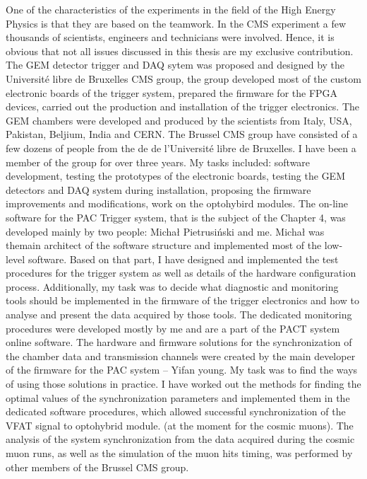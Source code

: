 
\def\baselinestretch{0.5}


One of the characteristics of the experiments in the field of the High Energy
Physics is that they are based on the teamwork. In the CMS experiment a few thousands of
scientists, engineers and technicians were involved. Hence, it is obvious that not all issues
discussed in this thesis are my exclusive contribution.
The GEM detector trigger and DAQ sytem was proposed and designed by the Université libre de Bruxelles CMS
group, the group developed most of the custom electronic boards of the trigger system,
prepared the firmware for the FPGA devices, carried out the production and installation of the
trigger electronics. The GEM chambers were developed and produced by the scientists from
Italy, USA, Pakistan, Beljium, India and CERN. The Brussel CMS group have consisted
of a few dozens of people from the de de l'Université libre de Bruxelles. I have been a member of the group for over three years. My tasks included: software development, testing the prototypes of the electronic boards, testing the GEM detectors and DAQ system during installation, proposing the firmware improvements and modifications, work on the optohybird modules.
The on-line software for the PAC Trigger system, that is the subject of the
Chapter 4, was developed mainly by two people: Michał Pietrusiński and me. Michał was themain architect of the software structure and implemented most of the low-level software.
Based on that part, I have designed and implemented the test procedures for the trigger system
as well as details of the hardware configuration process. Additionally, my task was to decide
what diagnostic and monitoring tools should be implemented in the firmware of the trigger
electronics and how to analyse and present the data acquired by those tools. The dedicated
monitoring procedures were developed mostly by me and are a part of the PACT system
online software. 
The hardware and firmware solutions for the synchronization of the chamber data
and transmission channels were created by the main developer of the firmware for the PAC
system – Yifan young. My task was to find the ways of using those solutions in
practice. I have worked out the methods for finding the optimal values of the synchronization
parameters and implemented them in the dedicated software procedures, which allowed
successful synchronization of the VFAT signal to optohybrid module. (at the moment for the cosmic muons). The
analysis of the system synchronization from the data acquired during the cosmic muon runs,
as well as the simulation of the muon hits timing, was performed by other members of the
Brussel CMS group.
